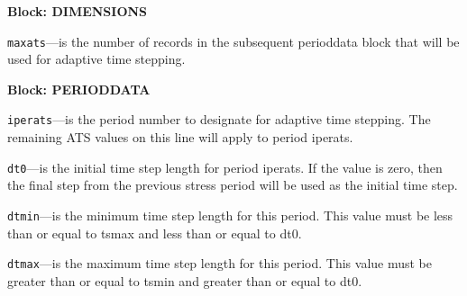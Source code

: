 
\item \textbf{Block: DIMENSIONS}

\begin{description}
\item \texttt{maxats}---is the number of records in the subsequent perioddata block that will be used for adaptive time stepping.

\end{description}
\item \textbf{Block: PERIODDATA}

\begin{description}
\item \texttt{iperats}---is the period number to designate for adaptive time stepping.  The remaining ATS values on this line will apply to period iperats.

\item \texttt{dt0}---is the initial time step length for period iperats.  If the value is zero, then the final step from the previous stress period will be used as the initial time step.

\item \texttt{dtmin}---is the minimum time step length for this period.  This value must be less than or equal to tsmax and less than or equal to dt0.

\item \texttt{dtmax}---is the maximum time step length for this period.  This value must be greater than or equal to tsmin and greater than or equal to dt0.

\end{description}


